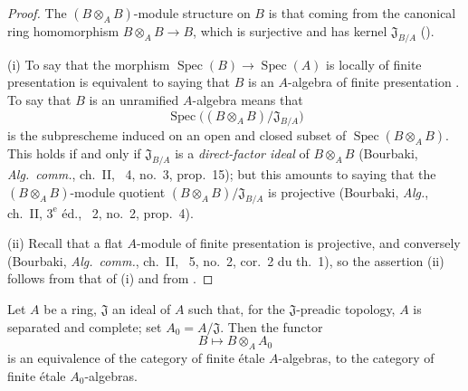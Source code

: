 \begin{proof}
The $(B\otimes_A B)$-module structure on $B$ is that coming from the canonical ring homomorphism $B\otimes_A B\to B$, which is surjective and has kernel $\mathfrak{J}_{B/A}$ ().

(i) To say that the morphism $\operatorname{Spec}(B)\to\operatorname{Spec}(A)$ is locally of finite presentation is equivalent to saying that $B$ is an $A$-algebra of finite presentation .  To say that $B$ is an unramified $A$-algebra means  that
\[
 \operatorname{Spec}\bigl((B\otimes_A B)/\mathfrak{J}_{B/A}\bigr)
\]
is the subprescheme induced on an open and closed subset of $\operatorname{Spec}(B\otimes_A B)$.  This holds if and only if $\mathfrak{J}_{B/A}$ is a \emph{direct-factor ideal} of $B\otimes_A B$ (Bourbaki, \emph{Alg.\ comm.}, ch.~II, \textsection~4, no.~3, prop.~15);
but this amounts to saying that the $(B\otimes_A B)$-module quotient $(B\otimes_A B)/\mathfrak{J}_{B/A}$ is projective (Bourbaki, \emph{Alg.}, ch.~II, $3^{\text{e}}$ \'ed., \textsection~2, no.~2, prop.~4).

(ii) Recall that a flat $A$-module of finite presentation is projective, and conversely (Bourbaki, \emph{Alg.\ comm.}, ch.~II, \textsection~5, no.~2, cor.~2 du th.~1), so the assertion (ii) follows from that of (i) and from .
\end{proof}

\begin{proposition}[18.3.2]
\label{IV.18.3.2}
Let $A$ be a ring, $\mathfrak{J}$ an ideal of $A$ such that, for the $\mathfrak{J}$-preadic topology, $A$ is separated and complete;
set $A_0=A/\mathfrak{J}$.
Then the functor
\[
B\mapsto B\otimes_A A_0
\]
is an equivalence of the category of finite \'etale $A$-algebras, to the category of finite \'etale $A_0$-algebras.
\end{proposition}

